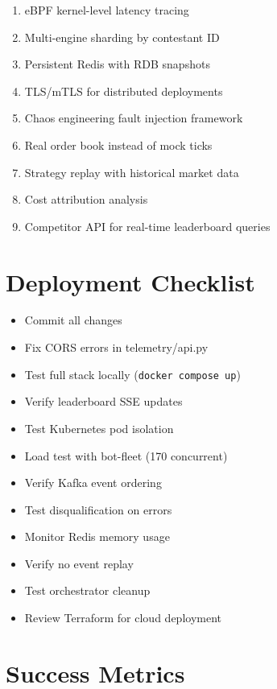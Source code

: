 \documentclass[10pt,a4paper,oneside]{report}
\begin{document}
\begin{enumerate}
    \item eBPF kernel-level latency tracing
    \item Multi-engine sharding by contestant ID
    \item Persistent Redis with RDB snapshots
    \item TLS/mTLS for distributed deployments
    \item Chaos engineering fault injection framework
    \item Real order book instead of mock ticks
    \item Strategy replay with historical market data
    \item Cost attribution analysis
    \item Competitor API for real-time leaderboard queries
\end{enumerate}

\section{Deployment Checklist}

\begin{itemize}
    \item[\Square] Commit all changes
    \item[\Square] Fix CORS errors in telemetry/api.py
    \item[\Square] Test full stack locally (\texttt{docker compose up})
    \item[\Square] Verify leaderboard SSE updates
    \item[\Square] Test Kubernetes pod isolation
    \item[\Square] Load test with bot-fleet (170 concurrent)
    \item[\Square] Verify Kafka event ordering
    \item[\Square] Test disqualification on errors
    \item[\Square] Monitor Redis memory usage
    \item[\Square] Verify no event replay
    \item[\Square] Test orchestrator cleanup
    \item[\Square] Review Terraform for cloud deployment
\end{itemize}

\section{Success Metrics}
\end{document}
